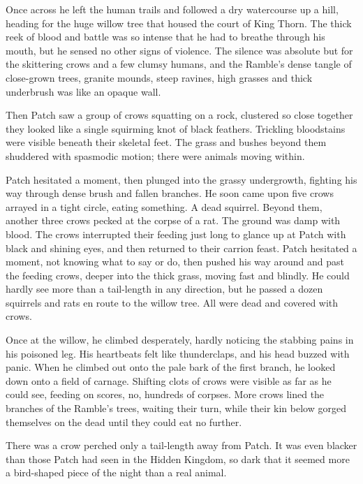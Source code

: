 \documentclass[ebook,oneside,openany,17pt]{memoir}
\newenvironment{tolerant}[1]{%
  \par\tolerance=#1\relax
}{%
  \par
}
\begin{document}
Once across he left the human trails and followed a dry watercourse up
a hill, heading for the huge willow tree that housed the court of King
Thorn. The thick reek of blood and battle was so intense that he had
to breathe through his mouth, but he sensed no other signs of
violence. The silence was absolute but for the skittering crows and a
few clumsy humans, and the Ramble’s dense tangle of close-grown trees,
granite mounds, steep ravines, high grasses and thick underbrush was
like an opaque wall.

\begin{tolerant}{1000}
Then Patch saw a group of crows squatting on a rock, clustered so
close together they looked like a single squirming knot of black
feathers. Trickling bloodstains were visible beneath their skeletal
feet. The grass and bushes beyond them shuddered with spasmodic
motion; there were animals moving within.
\end{tolerant}

Patch hesitated a moment, then plunged into the grassy undergrowth,
fighting his way through dense brush and fallen branches. He soon came
upon five crows arrayed in a tight circle, eating something. A dead
squirrel. Beyond them, another three crows pecked at the corpse of a
rat. The ground was damp with blood. The crows interrupted their
feeding just long to glance up at Patch with black and shining eyes,
and then returned to their carrion feast. Patch hesitated a moment,
not knowing what to say or do, then pushed his way around and past the
feeding crows, deeper into the thick grass, moving fast and
blindly. He could hardly see more than a tail-length in any direction,
but he passed a dozen squirrels and rats en route to the willow
tree. All were dead and covered with crows.

\begin{tolerant}{1000}
Once at the willow, he climbed desperately, hardly noticing the
stabbing pains in his poisoned leg. His heartbeats felt like
thunderclaps, and his head buzzed with panic. When he climbed out onto
the pale bark of the first branch, he looked down onto a field of
carnage. Shifting clots of crows were visible as far as he could see,
feeding on scores, no, hundreds of corpses. More crows lined the
branches of the Ramble’s trees, waiting their turn, while their kin
below gorged themselves on the dead until they could eat no further.
\end{tolerant}

There was a crow perched only a tail-length away from Patch. It was
even blacker than those Patch had seen in the Hidden Kingdom, so dark
that it seemed more a bird-shaped piece of the night than a real
animal.
\end{document}
